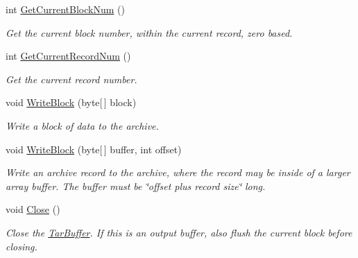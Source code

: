 \begin{DoxyCompactItemize}
int \hyperlink{class_i_c_sharp_code_1_1_sharp_zip_lib_1_1_tar_1_1_tar_buffer_ac45071c45a41ad084cb7331bf4f1b22c}{Get\+Current\+Block\+Num} ()
\begin{DoxyCompactList}\small\item\em Get the current block number, within the current record, zero based. \end{DoxyCompactList}\item 
int \hyperlink{class_i_c_sharp_code_1_1_sharp_zip_lib_1_1_tar_1_1_tar_buffer_a8a4a278e065e9fe09cc2e2047b04278e}{Get\+Current\+Record\+Num} ()
\begin{DoxyCompactList}\small\item\em Get the current record number. \end{DoxyCompactList}\item 
void \hyperlink{class_i_c_sharp_code_1_1_sharp_zip_lib_1_1_tar_1_1_tar_buffer_ac056c9ebad84ff430b52d9d25c5b7d28}{Write\+Block} (byte\mbox{[}$\,$\mbox{]} block)
\begin{DoxyCompactList}\small\item\em Write a block of data to the archive. \end{DoxyCompactList}\item 
void \hyperlink{class_i_c_sharp_code_1_1_sharp_zip_lib_1_1_tar_1_1_tar_buffer_a984d12bfe71efbc5ae6d9f969c4dd3f0}{Write\+Block} (byte\mbox{[}$\,$\mbox{]} buffer, int offset)
\begin{DoxyCompactList}\small\item\em Write an archive record to the archive, where the record may be inside of a larger array buffer. The buffer must be \char`\"{}offset plus
record size\char`\"{} long. \end{DoxyCompactList}\item 
void \hyperlink{class_i_c_sharp_code_1_1_sharp_zip_lib_1_1_tar_1_1_tar_buffer_a3afc582eabfc493257c71e2fd317b3cc}{Close} ()
\begin{DoxyCompactList}\small\item\em Close the \hyperlink{class_i_c_sharp_code_1_1_sharp_zip_lib_1_1_tar_1_1_tar_buffer}{Tar\+Buffer}. If this is an output buffer, also flush the current block before closing. \end{DoxyCompactList}\end{DoxyCompactItemize}
